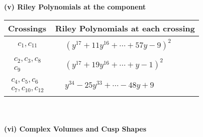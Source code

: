 \documentclass[1p]{elsarticle_modified}
\theoremstyle{definition}
\begin{document}
\newpage\renewcommand{\arraystretch}{1}
\flushleft \textbf{(v) Riley Polynomials at the component}\newline \\
\begin{tabular}{m{50pt}|m{274pt}}
Crossings & \hspace{64pt}Riley Polynomials at each crossing \\
\hline $$\begin{aligned}c_{1},c_{11}\end{aligned}$$&$\begin{aligned}
&(y^{17}+11 y^{16}+\cdots+57 y-9)^{2}
\end{aligned}$\\
\hline $$\begin{aligned}c_{2},c_{3},c_{8}\\c_{9}\end{aligned}$$&$\begin{aligned}
&(y^{17}+19 y^{16}+\cdots+y-1)^{2}
\end{aligned}$\\
\hline $$\begin{aligned}c_{4},c_{5},c_{6}\\c_{7},c_{10},c_{12}\end{aligned}$$&$\begin{aligned}
&y^{34}-25 y^{33}+\cdots-48 y+9
\end{aligned}$\\
\hline
\end{tabular}\\~\\
\newpage\flushleft \textbf{(vi) Complex Volumes and Cusp Shapes}
\end{document}
